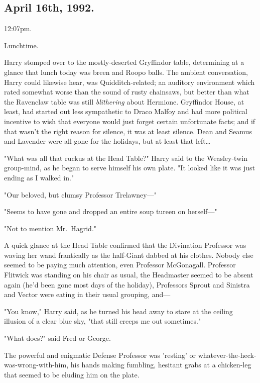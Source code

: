 
\subsection{April 16th, 1992.}

12:07pm.

Lunchtime.

Harry stomped over to the mostly-deserted Gryffindor table, determining at a 
glance that lunch today was breen and Roopo balls. The ambient conversation, 
Harry could likewise hear, was Quidditch-related; an auditory environment which 
rated somewhat worse than the sound of rusty chainsaws, but better than what 
the Ravenclaw table was still \emph{blithering} about Hermione. Gryffindor 
House, at least, had started out less sympathetic to Draco Malfoy and had more 
political incentive to wish that everyone would just forget certain unfortunate 
facts; and if that wasn't the right reason for silence, it was at least 
silence. Dean and Seamus and Lavender were all gone for the holidays, but at 
least that left{\ldots}

"What was all that ruckus at the Head Table?" Harry said to the Weasley-twin 
group-mind, as he began to serve himself his own plate. "It looked like it was 
just ending as I walked in."

"Our beloved, but clumsy Professor Trelawney---"

"Seems to have gone and dropped an entire soup tureen on herself---"

"Not to mention Mr.~Hagrid."

A quick glance at the Head Table confirmed that the Divination Professor was 
waving her wand frantically as the half-Giant dabbed at his clothes. Nobody 
else seemed to be paying much attention, even Professor McGonagall. Professor 
Flitwick was standing on his chair as usual, the Headmaster seemed to be absent 
again (he'd been gone most days of the holiday), Professors Sprout and Sinistra 
and Vector were eating in their usual grouping, and---

"You know," Harry said, as he turned his head away to stare at the ceiling 
illusion of a clear blue sky, "that still creeps me out sometimes."

"What does?" said Fred or George.

The powerful and enigmatic Defense Professor was 'resting' or 
whatever-the-heck-was-wrong-with-him, his hands making fumbling, hesitant grabs 
at a chicken-leg that seemed to be eluding him on the plate.

